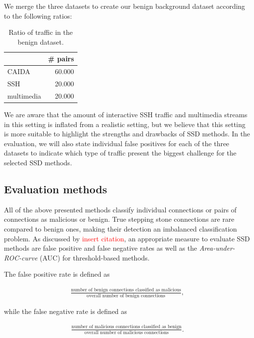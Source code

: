\documentclass[runningheads]{llncs}\usepackage[]{graphicx}\usepackage[]{color}
\begin{document}
We merge the three datasets to create our benign background dataset according to the following ratios:

\begin{table}
\centering
\begin{tabular}{l|r}
&\# pairs \\ \hline
CAIDA& 60.000\\ \hline
SSH& 20.000 \\ \hline
multimedia& 20.000 \\ \hline
\end{tabular}
\caption{Ratio of traffic in the benign dataset.}\label{Tab:Benigndata}
\end{table}

We are aware that the amount of interactive SSH traffic and multimedia streams in this setting is inflated from a realistic setting, but we believe that this setting is more suitable to highlight the strengths and drawbacks of SSD methods. In the evaluation, we will also state individual false positives for each of the three datasets to indicate which type of traffic present the biggest challenge for the selected SSD methods.  


\subsection{Evaluation methods}

All of the above presented methods classify individual connections or pairs of connections as malicious or benign. True stepping stone connections are rare compared to benign ones, making their detection an imbalanced classification problem. As discussed by \textcolor{red}{insert citation}, an appropriate measure to evaluate SSD methods are false positive and false negative rates as well as the \textit{Area-under-ROC-curve} (AUC) for threshold-based methods.

The false positive rate is defined as

\begin{align*}
\frac{\text{number of benign connections classified as malicious}}{\text{overall number of benign connections}},
\end{align*}

while the false negative rate is defined as

\begin{align*}
\frac{\text{number of malicious connections classified as benign}}{\text{overall number of malicious connections}}.
\end{align*}
\end{document}
